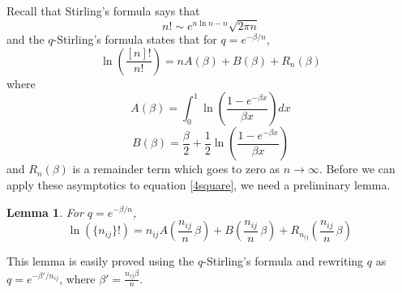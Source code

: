 \documentclass[12pt]{report}
\newtheorem{lem}[thm]{Lemma}
\theoremstyle{definition}
\begin{document}
Recall that Stirling's formula says that 
$$
n!\sim e^{n\ln n-n}\sqrt{2\pi n}
$$
and the $q$-Stirling's formula states that for $q=e^{-\beta/n}$,
$$
\ln\left(\frac{[n]!}{n!}\right)=nA(\beta)+B(\beta)+R_n(\beta)
$$
where 
$$
A(\beta)=\int_0^1\ln\left(\frac{1-e^{-\beta x}}{\beta x}\right) dx
$$
$$
B(\beta)=\frac{\beta}{2}+\frac{1}{2}\ln\left(\frac{1-e^{-\beta x}}{\beta x}\right)
$$
and $R_n(\beta)$ is a remainder term which goes to zero as $n\rightarrow\infty$. Before we can apply these asymptotics to equation \ref{4square}, we need a preliminary lemma.
\begin{lem}
For $q=e^{-\beta/n}$, 
$$
\ln(\{n_{ij}\}!)=n_{ij} A\left(\frac{n_{ij}}{n}\, \beta\right) + B\left(\frac{n_{ij}}{n}\, \beta\right) + R_{n_{ij}}\left(\frac{n_{ij}}{n}\, \beta\right)\,
$$
\end{lem}
This lemma is easily proved using the $q$-Stirling's formula and rewriting $q$ as $q=e^{-\beta '/n_{ij}}$, where $\beta '=\frac{n_{ij}\beta}{n}$.  
\end{document}
